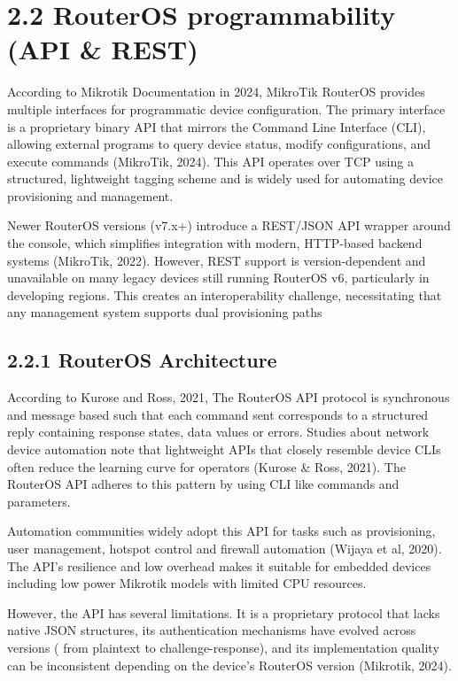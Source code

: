 \documentclass[12pt,a4paper,oneside]{report}
\begin{document}
\section{2.2 RouterOS programmability (API \& REST) }

According to Mikrotik Documentation in 2024, MikroTik RouterOS provides\textbf{ }multiple interfaces for programmatic device configuration. The primary interface is a proprietary binary API that mirrors the Command Line Interface (CLI), allowing external programs to query device status, modify configurations, and execute commands (MikroTik, 2024). This API operates over TCP using a structured, lightweight tagging scheme and is widely used for automating device provisioning and management.




Newer RouterOS versions (v7.x+) introduce a REST/JSON API wrapper around the console, which simplifies integration with modern, HTTP-based backend systems (MikroTik, 2022). However, REST support is version-dependent and unavailable on many legacy devices still running RouterOS v6, particularly in developing regions. This creates an interoperability challenge, necessitating that any management system supports dual provisioning paths


\subsection{2.2.1 RouterOS Architecture}

According to Kurose and Ross, 2021, The RouterOS API protocol is synchronous and message based such that each command sent corresponds to a structured reply containing response states, data values or errors. Studies about network device automation note that lightweight APIs that closely resemble device CLIs often reduce the learning curve for operators (Kurose \& Ross, 2021). The RouterOS API adheres to this pattern by using CLI like commands and parameters.


Automation communities widely adopt this API for tasks such as provisioning, user management, hotspot control and firewall automation (Wijaya et al, 2020). The API's resilience and low overhead makes it suitable for embedded devices including low power Mikrotik models with limited CPU resources.


However, the API has several limitations. It is a proprietary protocol that lacks native JSON structures, its authentication mechanisms have evolved across versions ( from plaintext to challenge-response), and its implementation quality can be inconsistent depending on the device's RouterOS version (Mikrotik, 2024).
\end{document}

